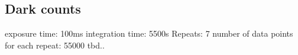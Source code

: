 \subsection{Dark counts}
exposure time: 100ms
integration time: 5500s
Repeats: 7
number of data points for each repeat: 55000
tbd..

